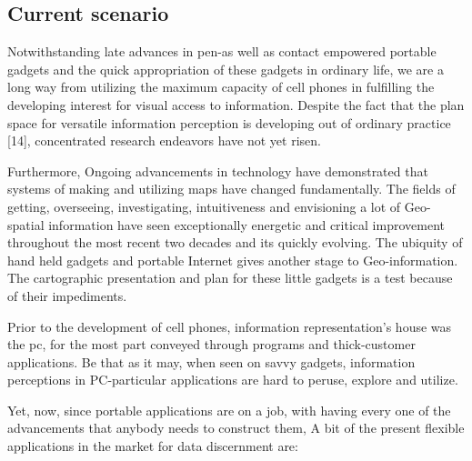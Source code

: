 \subsection{Current scenario}

Notwithstanding late advances in pen-as well as contact empowered portable gadgets and the quick appropriation of these gadgets in ordinary life, we are a long way from utilizing the maximum capacity of cell phones in fulfilling the developing interest for visual access to information. Despite the fact that the plan space for versatile  information perception is developing out of ordinary practice [14], concentrated research endeavors have not yet risen.

Furthermore, Ongoing advancements in technology have demonstrated that systems of making and utilizing maps have changed fundamentally. The fields of getting, overseeing, investigating, intuitiveness and envisioning a lot of Geo-spatial information have seen exceptionally energetic and critical improvement throughout the most recent two decades and its quickly evolving. The ubiquity of hand held gadgets and portable Internet gives another stage to Geo-information. The cartographic presentation and plan for these little gadgets is a test because of their impediments.

Prior to the development of cell phones, information representation's house was the \gls{pc}, for the most part conveyed through programs and thick-customer applications. Be that as it may, when seen on savvy gadgets, information perceptions in PC-particular applications are hard to peruse, explore and utilize.

Yet, now, since portable applications are on a job, with having every one of the advancements that anybody needs to construct them, A bit of the present flexible applications in the market for data discernment are:

